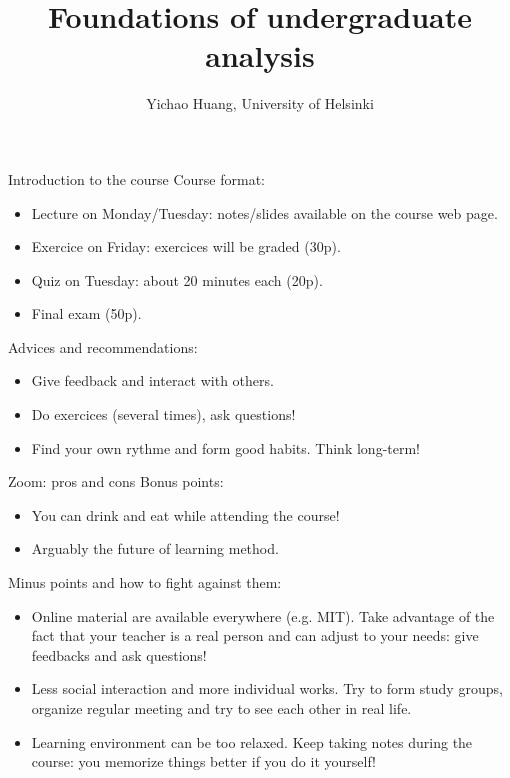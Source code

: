 \documentclass[aspectratio=1610]{beamer}
\title{Foundations of undergraduate analysis}
\author{Yichao Huang, University of Helsinki}
\begin{document}
\maketitle

\begin{frame}{Introduction to the course}
Course format:
\begin{itemize}
	\item Lecture on Monday/Tuesday: notes/slides available on the course web page.
	\item Exercice on Friday: exercices will be graded (30p).
	\item Quiz on Tuesday: about 20 minutes each (20p).
	\item Final exam (50p).
\end{itemize}

Advices and recommendations:
\begin{itemize}
  \item Give feedback and interact with others.
  \item Do exercices (several times), ask questions!
  \item Find your own rythme and form good habits. Think long-term!
\end{itemize}
\end{frame}

\begin{frame}{Zoom: pros and cons}
Bonus points:
\begin{itemize}
	\item You can drink and eat while attending the course!
	\item Arguably the future of learning method.
\end{itemize}

Minus points and how to fight against them:
\begin{itemize}
	\item Online material are available everywhere (e.g. MIT). Take advantage of the fact that your teacher is a real person and can adjust to your needs: give feedbacks and ask questions!
	\item Less social interaction and more individual works. Try to form study groups, organize regular meeting and try to see each other in real life.
	\item Learning environment can be too relaxed. Keep taking notes during the course: you memorize things better if you do it yourself!
\end{itemize}
\end{frame}
\end{document}

